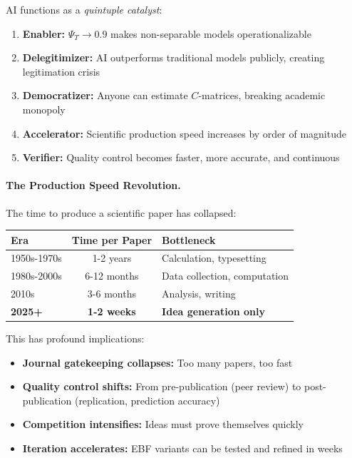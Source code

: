 AI functions as a \textit{quintuple catalyst}:

\begin{enumerate}[nosep]
    \item \textbf{Enabler:} $\Psi_T \to 0.9$ makes non-separable models operationalizable
    \item \textbf{Delegitimizer:} AI outperforms traditional models publicly, creating
        legitimation crisis
    \item \textbf{Democratizer:} Anyone can estimate $C$-matrices, breaking academic monopoly
    \item \textbf{Accelerator:} Scientific production speed increases by order of magnitude
    \item \textbf{Verifier:} Quality control becomes faster, more accurate, and continuous
\end{enumerate}

\paragraph{The Production Speed Revolution.}

The time to produce a scientific paper has collapsed:

\begin{center}
\renewcommand{\arraystretch}{1.3}
\small
\begin{tabular}{@{}lcl@{}}
\toprule
\textbf{Era} & \textbf{Time per Paper} & \textbf{Bottleneck} \\
\midrule
1950s-1970s & 1-2 years & Calculation, typesetting \\
1980s-2000s & 6-12 months & Data collection, computation \\
2010s & 3-6 months & Analysis, writing \\
\textbf{2025+} & \textbf{1-2 weeks} & \textbf{Idea generation only} \\
\bottomrule
\end{tabular}
\end{center}

This has profound implications:
\begin{itemize}[nosep]
    \item \textbf{Journal gatekeeping collapses:} Too many papers, too fast
    \item \textbf{Quality control shifts:} From pre-publication (peer review) to
        post-publication (replication, prediction accuracy)
    \item \textbf{Competition intensifies:} Ideas must prove themselves quickly
    \item \textbf{Iteration accelerates:} EBF variants can be tested and refined in weeks
\end{itemize}

